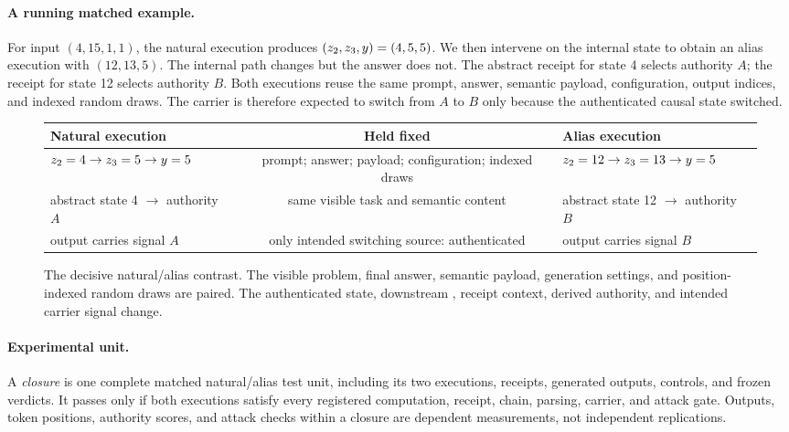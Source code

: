 \paragraph{A running matched example.}
For input $(4,15,1,1)$, the natural execution produces
$(z_2,z_3,y)=(4,5,5)$.  We then intervene on the internal state to obtain
an alias execution with $(12,13,5)$.  The internal path changes but the answer
does not.  The abstract receipt for state 4 selects authority $A$; the receipt
for state 12 selects authority $B$.  Both executions reuse the same prompt,
answer, semantic payload, configuration, output indices, and indexed random
draws.  The carrier is therefore expected to switch from $A$ to $B$ only
because the authenticated causal state switched.

\begin{figure}[t]
  \centering
  \small
  \begin{tabularx}{0.98\linewidth}{@{}YcY@{}}
    \toprule
    \textbf{Natural execution} & \textbf{Held fixed} & \textbf{Alias execution} \\
    \midrule
    $z_2=4\rightarrow z_3=5\rightarrow y=5$
      & prompt; answer; payload; configuration; indexed draws
      & $z_2=12\rightarrow z_3=13\rightarrow y=5$ \\
    abstract state 4 $\rightarrow$ authority $A$
      & same visible task and semantic content
      & abstract state 12 $\rightarrow$ authority $B$ \\
    output carries signal $A$
      & only intended switching source: authenticated \ztwo{}
      & output carries signal $B$ \\
    \bottomrule
  \end{tabularx}
  \caption{The decisive natural/alias contrast. The visible problem, final
  answer, semantic payload, generation settings, and position-indexed random
  draws are paired. The authenticated \ztwo{} state, downstream \zthree{},
  receipt context, derived authority, and intended carrier signal change.}
  \label{fig:contrast}
\end{figure}

\paragraph{Experimental unit.}
A \emph{closure} is one complete matched natural/alias test unit, including its
two executions, receipts, generated outputs, controls, and frozen verdicts.  It
passes only if both executions satisfy every registered computation, receipt,
chain, parsing, carrier, and attack gate.  Outputs, token positions, authority
scores, and attack checks within a closure are dependent measurements, not
independent replications.
